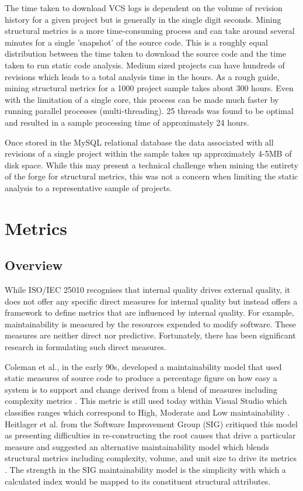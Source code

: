 The time taken to download VCS logs is dependent on the volume of revision history for a given project but is generally in the single digit seconds. Mining structural metrics is a more time-consuming process and can take around several minutes for a single 'snapshot' of the source code. This is a roughly equal distribution between the time taken to download the source code and the time taken to run static code analysis. Medium sized projects can have hundreds of revisions which leads to a total analysis time in the hours. As a rough guide, mining structural metrics for a 1000 project sample takes about 300 hours. Even with the limitation of a single core, this process can be made much faster by running parallel processes (multi-threading). 25 threads was found to be optimal and resulted in a sample processing time of approximately 24 hours.

Once stored in the MySQL relational database the data associated with all revisions of a single project within the sample takes up approximately 4-5MB of disk space. While this may present a technical challenge when mining the entirety of the forge for structural metrics, this was not a concern when limiting the static analysis to a representative sample of projects.

\section{Metrics} %
\subsection{Overview}
While ISO/IEC 25010 recognises that internal quality drives external quality, it does not offer any specific direct measures for internal quality but instead offers a framework to define metrics that are influenced by internal quality. For example, maintainability is measured by the resources expended to modify software. These measures are neither direct nor predictive. Fortunately, there has been significant research in formulating such direct measures. 

Coleman et al., in the early 90s, developed a maintainability model that used static measures of source code to produce a percentage figure on how easy  a system is to support and change derived from a blend of measures including complexity metrics \citep{coleman1994using}. This metric is still used today within Visual Studio which classifies ranges which correspond to High, Moderate and Low maintainability \citep{msdn2015code}. Heitlager et al. from the Software Improvement Group (SIG) critiqued this model as presenting difficulties in re-constructing the root causes that drive a particular measure and suggested an alternative maintainability model which blends structural metrics including complexity, volume, and unit size to drive its metrics \citep{heitlager2007practical}. The strength in the SIG maintainability model is the simplicity with which a calculated index would be mapped to its constituent structural attributes.

